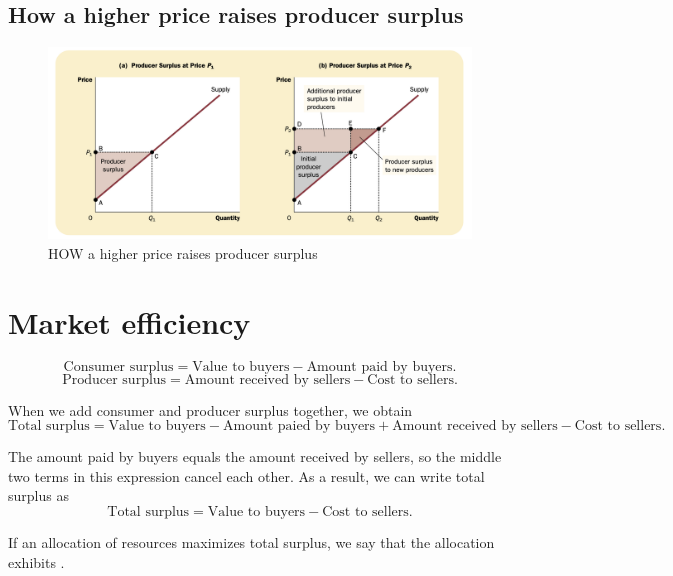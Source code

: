 \subsection{How a higher price raises producer surplus}

\begin{figure}[!ht]
  \centering
  \includegraphics[width=\textwidth]{pics/producer-surplus2}
  \caption{HOW a higher price raises producer surplus}
  \label{fig:the-producer-surplus2}
\end{figure}


\section{Market efficiency}

\begin{equation}
  \text{Consumer surplus} = \text{Value to buyers} - \text{Amount paid by buyers}.
\end{equation}
\begin{equation}
  \text{Producer surplus} = \text{Amount received by sellers} - \text{Cost to sellers}.
\end{equation}


When we add consumer and producer surplus together, we obtain
\begin{equation}
  \text{Total surplus} = \text{Value to buyers} - \text{Amount paied by buyers}
  + \text{Amount received by sellers} - \text{Cost to sellers}.
\end{equation}

The amount paid by buyers equals the amount received by sellers, so the middle two terms in this expression cancel each other.
As a result, we can write total surplus as
\begin{equation}
  \text{Total surplus} = \text{Value to buyers} - \text{Cost to sellers}.
\end{equation}

If an allocation of resources maximizes total surplus, we say that the allocation exhibits .


